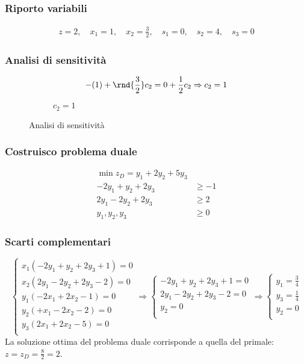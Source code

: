 \documentclass[\main/main.tex]{subfiles}
\begin{document}
\subsubsection*{Riporto variabili}
\begin{align*}
  z = 2, \quad
  x_1 = 1, \quad
  x_2 = \frac{3}{2}, \quad
  s_1 = 0, \quad
  s_2 = 4, \quad
  s_3 = 0
\end{align*}
\subsubsection*{Analisi di sensitività}

\begin{figure}
  \begin{subfigure}{0.49\textwidth}
    \[
      -(1) + \rnd{\frac{3}{2}}c_2 = 0 + \frac{1}{2}c_2 \Rightarrow c_2 = 1
    \]
  \end{subfigure}
  \begin{subfigure}{0.49\textwidth}
    \caption{$c_2 = 1$}
  \end{subfigure}
  \caption{Analisi di sensitività}
\end{figure}

\subsubsection*{Costruisco problema duale}
\begin{align*}
  \min z_D = y_1 + 2y_2 + 5y_3 \\
  -2y_1 + y_2 + 2y_3 & \geq -1 \\
  2y_1 -2y_2 + 2y_3  & \geq 2  \\
  y_1, y_2, y_3      & \geq 0
\end{align*}
\subsubsection*{Scarti complementari}
\[
  \begin{cases}
    x_1(-2y_1 + y_2 + 2y_3  +1) = 0 \\
    x_2(2y_1 -2y_2 + 2y_3  -2 ) = 0 \\
    y_1(-2x_1 + 2x_2 -1) = 0        \\
    y_2(+x_1 - 2x_2  -2) = 0        \\
    y_3(2x_1 + 2x_2  -5) = 0        \\
  \end{cases}
  \Rightarrow
  \begin{cases}
    -2y_1 + y_2 + 2y_3  +1 = 0 \\
    2y_1 -2y_2 + 2y_3  -2  = 0 \\
    y_2 = 0                    \\
  \end{cases}
  \Rightarrow
  \begin{cases}
    y_1 = \frac{3}{4} \\
    y_3 = \frac{1}{4} \\
    y_2 = 0           \\
  \end{cases}
\]
La soluzione ottima del problema duale corrisponde a quella del primale: $z = z_D = \frac{8}{2} = 2$.
\end{document}
